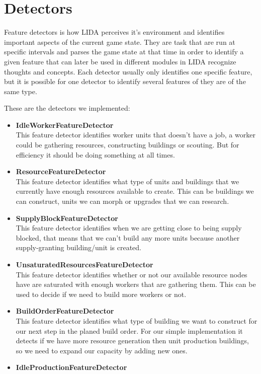 \section{Detectors}
\label{sec:detectors}
Feature detectors is how LIDA perceives it's environment and identifies important aspects of the current game state. They are task that are run at specific intervals and parses the game state at that time in order to identify a given feature that can later be used in different modules in LIDA recognize thoughts and concepts. Each detector usually only identifies one specific feature, but it is possible for one detector to identify several features of they are of the same type. 

These are the detectors we implemented: 
\begin{itemize}
\item \textbf{IdleWorkerFeatureDetector} \\
This feature detector identifies worker units that doesn't have a job, a worker could be gathering resources, constructing buildings or scouting. But for efficiency it should be doing something at all times. 
\item \textbf{ResourceFeatureDetector} \\
This feature detector identifies what type of units and buildings that we currently have enough resources available to create. This can be buildings we can construct, units we can morph or upgrades that we can research. 
\item \textbf{SupplyBlockFeatureDetector} \\
This feature detector identifies when we are getting close to being supply blocked, that means that we can't build any more units because another supply-granting building/unit is created.
\item \textbf{UnsaturatedResourcesFeatureDetector} \\
This feature detector identifies whether or not our available resource nodes have are saturated with enough workers that are gathering them. This can be used to decide if we need to build more workers or not.
\item \textbf{BuildOrderFeatureDetector} \\
This feature detector identifies what type of building we want to construct for our next step in the planed build order. For our simple implementation it detects if we have more resource generation then unit production buildings, so we need to expand our capacity by adding new ones. 
\item \textbf{IdleProductionFeatureDetector} \\

\end{itemize}
